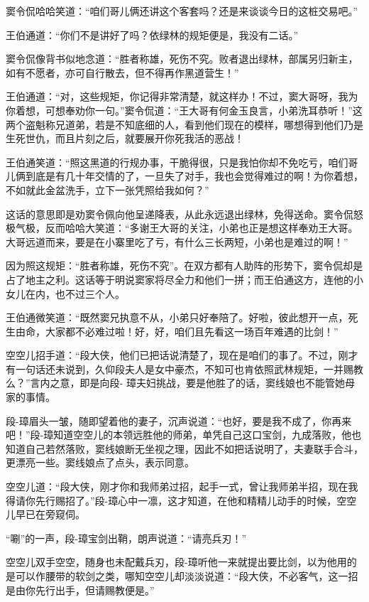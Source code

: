 \documentclass[12pt,oneside]{book}
\begin{document}
窦令侃哈哈笑道：``咱们哥儿俩还讲这个客套吗？还是来谈谈今日的这桩交易吧。''

王伯通道：``你们不是讲好了吗？依绿林的规矩便是，我没有二话。''

窦令侃像背书似地念道：``胜者称雄，死伤不究。败者退出绿林，部属另归新主，如有不愿者，亦可自行散去，但不得再作黑道营生！''

王伯通道：``对，这些规矩，你记得非常清楚，就这样办！不过，窦大哥呀，我为你着想，可想奉劝你一句。''窦令侃道：``王大哥有何金玉良言，小弟洗耳恭听！''这两个盗魁称兄道弟，若是不知底细的人，看到他们现在的模样，哪想得到他们乃是生死世仇，而且片刻之后，就要展开你死我活的恶战！

王伯通笑道：``照这黑道的行规办事，干脆得很，只是我怕你却不免吃亏，咱们哥儿俩到底是有几十年交情的了，一旦失了对手，我也会觉得难过的啊！为你着想，不如就此金盆洗手，立下一张凭照给我如何？''

这话的意思即是劝窦令佩向他呈递降表，从此永远退出绿林，免得送命。窦令侃怒极气极，反而哈哈大笑道：``多谢王大哥的关注，小弟也正是想这样奉劝王大哥。大哥远道而来，要是在小寨里吃了亏，有什么三长两短，小弟也是难过的啊！''

因为照这规矩：``胜者称雄，死伤不究''。在双方都有人助阵的形势下，窦令侃却是占了地主之利。这话等于明说窦家将尽全力和他们一拼；而王伯通这方，连他的小女儿在内，也不过三个人。

王伯通微笑道：``既然窦兄执意不从，小弟只好奉陪了。好啦，彼此想开一点，死生由命，大家都不必难过啦！好，好，咱们且先看这一场百年难遇的比剑！''

空空儿招手道：``段大侠，他们已把话说清楚了，现在是咱们的事了。不过，刚才有一句话还未说到，久仰段夫人是女中豪杰，不知可也肯依照武林规矩，一并赐教么？''言内之意，即是向段-
璋夫妇挑战，要是他胜了的话，窦线娘也不能管她母家的事情。

段-璋眉头一皱，随即望着他的妻子，沉声说道：``也好，要是我不成了，你再来吧！''段-璋知道空空儿的本领远胜他的师弟，单凭自己这口宝剑，九成落败，他也知道自己若然落败，窦线娘断无坐视之理，因此不如把话说明了，夫妻联手合斗，更漂亮一些。窦线娘点了点头，表示同意。

空空儿道：``段大侠，刚才你和我师弟过招，起手一式，曾让我师弟半招，现在我得请你先行赐招了。''段-璋心中一凛，这才知道，在他和精精儿动手的时候，空空儿早已在旁窥伺。

``唰''的一声，段-璋宝剑出鞘，朗声说道：``请亮兵刃！''

空空儿双手空空，随身也未配戴兵刃，段-璋听他一来就提出要比剑，以为他用的是可以作腰带的软剑之类，哪知空空儿却淡淡说道：``段大侠，不必客气，这一招是由你先行出手，但请赐教便是。''
\end{document}
